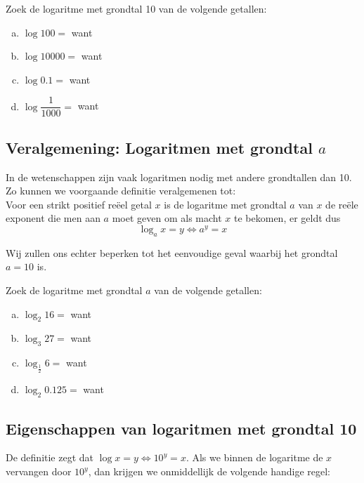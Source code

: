 \documentclass[12pt,twoside]{article}
\begin{document}
\begin{oefening}
Zoek de logaritme met grondtal 10 van de volgende getallen:\\
\begin{enumerate}[(a)]
  \itemsep1em
  \item $\log 100 = $\arule{2cm} want \arule{4cm}
  \item $\log 10000 = $\arule{2cm} want \arule{4cm}
  \item $\log 0.1 = $\arule{2cm} want \arule{4cm}
  \item $\log \dfrac{1}{1000} = $\arule{2cm} want \arule{4cm}
\end{enumerate}
\end{oefening}

\subsection{Veralgemening: Logaritmen met grondtal $a$}

In de wetenschappen zijn vaak logaritmen nodig met andere grondtallen dan 10. Zo kunnen we voorgaande definitie veralgemenen tot:\\
Voor een strikt positief reëel getal $x$ is de logaritme met grondtal $a$ van $x$ de reële exponent die men aan $a$ moet geven om als macht $x$ te bekomen, er geldt dus
$$\log_a x = y \Leftrightarrow a^y = x$$

Wij zullen ons echter beperken tot het eenvoudige geval waarbij het grondtal $a=10$ is.

\begin{oefening}
Zoek de logaritme met grondtal $a$ van de volgende getallen:\\
\begin{enumerate}[(a)]
  \itemsep1em
  \item $\log_2 16 = $\arule{2cm} want \arule{4cm}
  \item $\log_3 27 = $\arule{2cm} want \arule{4cm}
  \item $\log_{\frac{1}{2}} 6 = $\arule{2cm} want \arule{4cm}
  \item $\log_2 0.125 = $\arule{2cm} want \arule{4cm}
\end{enumerate}
\end{oefening}

\subsection{Eigenschappen van logaritmen met grondtal 10}

De definitie zegt dat $\log x = y \Leftrightarrow 10^y = x$. Als we binnen de logaritme de $x$ vervangen door $10^y$, dan krijgen we onmiddellijk de volgende handige regel:
\end{document}
